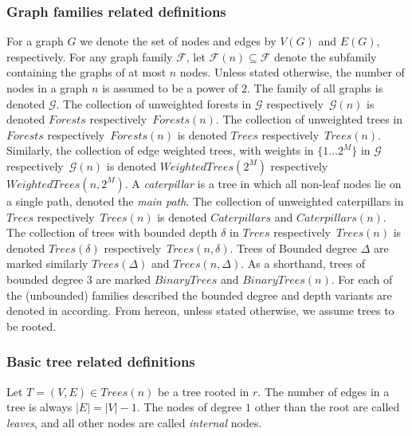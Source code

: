 			\subsubsection{Graph families related definitions} 
			For a graph $G$ we denote the set of nodes and edges by $V(G)$ and $E(G)$, respectively.
			For any graph family $\mathcal{F}$, let $\mathcal{F}(n) \subseteq \mathcal{F}$ denote the subfamily containing the graphs of at most $n$ nodes.
			Unless stated otherwise, the number of nodes in a graph $n$ is assumed to be a power of $2$. 
			The family of all graphs is denoted $\mathcal{G}$.
			 The collection of unweighted forests in $\mathcal{G}$ respectively~$\mathcal{G}(n)$  is  denoted $Forests$ respectively~$Forests(n)$. 
			The collection of unweighted trees in $Forests$ respectively~$Forests(n)$  is  denoted $Trees$ respectively~$Trees(n)$.
			Similarly,  the  collection of edge weighted trees, with weights in $\{1 \dots 2^M \}$  in $\mathcal{G}$ respectively~$\mathcal{G}(n)$ is denoted $WeightedTrees(2^M)$ respectively~$WeightedTrees(n,2^M)$.
			A \emph{caterpillar} is a tree in which all non-leaf nodes lie on a single path, denoted the \emph{main path}. The collection of unweighted caterpillars in $Trees$ respectively~$Trees(n)$  is denoted $Caterpillars$ and $Caterpillars(n)$.
			The collection of trees with bounded depth $\delta$ in $Trees$ respectively~$Trees(n)$  is  denoted $Trees(\delta)$ respectively~$Trees(n,\delta)$.
			Trees of  Bounded degree $\Delta$  are marked similarly $Trees(\Delta)$  and $Trees(n,\Delta)$.
			As a shorthand, trees of bounded degree $3$ are marked $BinaryTrees$ and $BinaryTrees(n)$. 
			For each of the (unbounded) families described the bounded degree and depth variants are denoted in according.
			From hereon, unless stated otherwise, we assume trees to be rooted. 

	\subsubsection{Basic tree related definitions} \label{definitions-of-trees}
	Let $T=(V,E) \in Trees(n)$ be a tree rooted in $r$. The number of edges in a tree is always $|E|=|V|-1$. The nodes of degree $1$ other than the root are called \emph{leaves}, and all other nodes are called \emph{internal} nodes.
	
